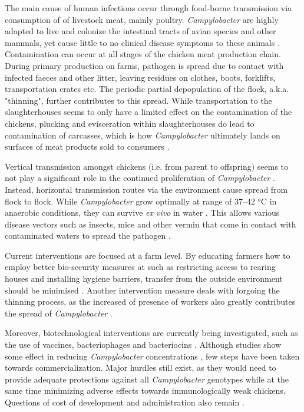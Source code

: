 The main cause of human infections occur through food-borne transmission via consumption of of livestock meat, mainly poultry\parencite{wilson_tracing_2008}. \textit{Campylobacter} are highly adapted to live and colonize the intestinal tracts of avian species and other mammals, yet cause little to no clinical disease symptoms to these animals \parencite{saif_diseases_2008}. Contamination can occur at all stages of the chicken meat production chain. During primary production on farms, pathogen is spread due to contact with infected faeces and other litter, leaving residues on clothes, boots, forklifts, transportation crates etc. The periodic partial depopulation of the flock, a.k.a. "thinning", further contributes to this spread. While transportation to the slaughterhouses seems to only have a limited effect on the contamination of the chickens, plucking and evisceration within slaughterhouses do lead to contamination of carcasses, which is how \textit{Campylobacter} ultimately lands on surfaces of meat products sold to consumers \parencite{skarp_campylobacteriosis_2015}.

Vertical transmission amongst chickens (i.e. from parent to offspring) seems to not play a significant role in the continued proliferation of \textit{Campylobacter} \parencite{callicott_lack_2006}. Instead, horizontal transmission routes via the environment cause spread from flock to flock. While \textit{Campylobacter} grow optimally at range of 37–42 °C in anaerobic conditions, they can survive \textit{ex vivo} in water \parencite{wilson_tracing_2008}. This allows various disease vectors such as insects, mice and other vermin that come in contact with contaminated waters to spread the pathogen \parencite{newell_sources_2003}.

Current interventions are focused at a farm level. By educating farmers how to employ better bio-security measures at such as restricting access to rearing houses and installing hygiene barriers, transfer from the outside environment should be minimised \parencite{hansson_knowledge_2018}. Another intervention measure deals with forgoing the thinning process, as the increased of presence of workers also greatly contributes the spread of \textit{Campylobacter} \parencite{lin_novel_2009}. 

Moreover, biotechnological interventions are currently being investigated, such as the use of vaccines, bacteriophages and bacteriocins \parencite{hansson_knowledge_2018}. Although studies show some effect in reducing \textit{Campylobacter} concentrations \parencite{wagenaar_phage_2005}, few steps have been taken towards commercialization. Major hurdles still exist, as they would need to provide adequate protections against all \textit{Campylobacter} genotypes while at the same time minimizing adverse effects towards immunologically weak chickens. Questions of cost of development and administration also remain \parencite{hansson_knowledge_2018}.

